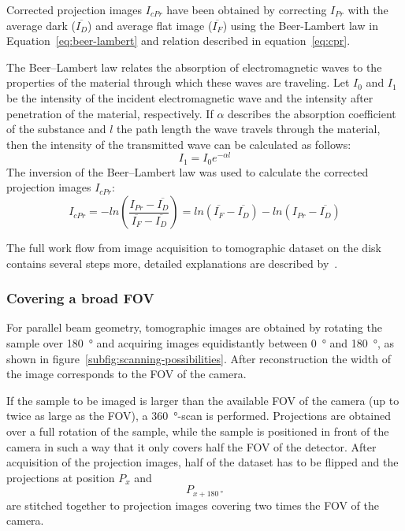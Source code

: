 Corrected projection images $I_{cPr}$ have been obtained by correcting $I_{Pr}$ with the average dark ($\overline{I_{D}}$) and average flat image ($\overline{I_{F}}$) using the Beer-Lambert law in Equation~\ref{eq:beer-lambert} and relation described in equation~\ref{eq:cpr}.

The Beer--Lambert law relates the absorption of electromagnetic waves to the properties of the material through which these waves are traveling. Let $I_{0}$ and $I_{1}$ be the intensity of the incident electromagnetic wave and the intensity after penetration of the material, respectively. If $\alpha$ describes the absorption coefficient of the substance and $l$ the path length the wave travels through the material, then the intensity of the transmitted wave can be calculated as follows:
\begin{equation}
	I_{1}=I_{0}e^{-\alpha l}
\label{eq:beer-lambert}
\end{equation}
The inversion of the Beer--Lambert law was used to calculate the corrected projection images $I_{cPr}$:
\begin{equation}
	I_{cPr} = -ln\left(\frac{I_{Pr}-\overline{I_{D}}}{\overline{I_{F}}-\overline{I_{D}}}\right)
	= ln(\overline{I_{F}}-\overline{I_{D}})-ln(I_{Pr}-\overline{I_{D}})
	\label{eq:cpr}
\end{equation}
\cbend

The full work flow from image acquisition to tomographic dataset on the disk contains several steps more, detailed explanations are described by~\citet{Hintermueller2009}.

\subsubsection{Covering a broad FOV}
\label{subsec:covering a broad fov}
For parallel beam geometry, tomographic images are obtained by rotating the sample over \SI{180}{\degree} and acquiring images equidistantly between \SI{0}{\degree} and \SI{180}{\degree}, as shown in figure~\ref{subfig:scanning-possibilities}. After reconstruction the width of the image corresponds to the FOV of the camera.

If the sample to be imaged is larger than the available FOV of the camera (up to twice as large as the FOV), a \SI{360}{\degree}-scan is performed. Projections are obtained over a full rotation of the sample, while the sample is positioned in front of the camera in such a way that it only covers half the FOV of the detector. After acquisition of the projection images, half of the dataset has to be flipped and the projections at position $P_{x}$ and \[P_{x+\SI{180}{\degree}}\] are stitched together to projection images covering two times the FOV of the camera.

